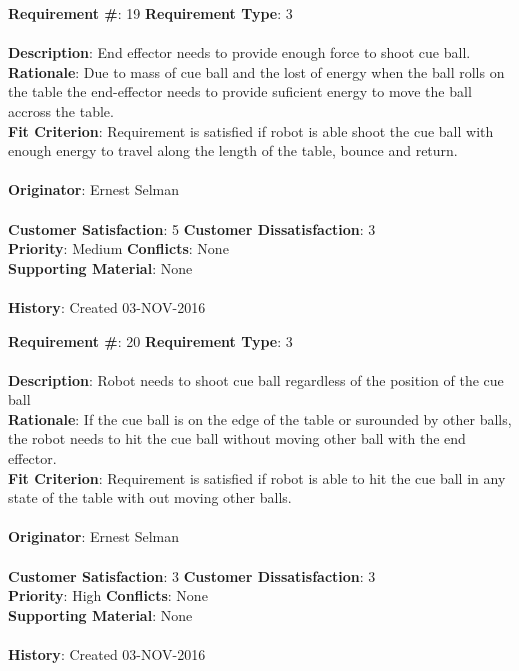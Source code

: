 \documentclass[titlepage]{article}
\begin{document}
\begin{framed}
	\noindent\textbf{Requirement \#}: 19 \hfill \textbf{Requirement Type}: 3 \hfill\\\\
	\noindent\textbf{Description}: End effector needs to provide enough force to shoot cue ball. \\
	\textbf{Rationale}: Due to mass of cue ball and the lost of energy when the ball rolls on the table the end-effector needs to provide suficient energy to move the ball accross the table.\\
	\textbf{Fit Criterion}: Requirement is satisfied if robot is able shoot the cue ball with enough energy to travel along the length of the table, bounce and return. \\\\
	\textbf{Originator}: Ernest Selman\\\\
	\noindent\textbf{Customer Satisfaction}: 5 \hfill 	\textbf{Customer Dissatisfaction}: 3 \hfill\\
	\textbf{Priority}: Medium \hfill \textbf{Conflicts}: None \hfill\\
	\textbf{Supporting Material}: None\\\\
	\noindent\textbf{History}: Created 03-NOV-2016
\end{framed}

\begin{framed}
	\noindent\textbf{Requirement \#}: 20 \hfill \textbf{Requirement Type}: 3 \hfill\\\\
	\noindent\textbf{Description}: Robot needs to shoot cue ball regardless of the position of the cue ball  \\
	\textbf{Rationale}: If the cue ball is on the edge of the table or surounded by other balls, the robot needs to hit the cue ball without moving other ball with the end effector. \\
	\textbf{Fit Criterion}: Requirement is satisfied if robot is able to hit the cue ball in any state of the table with out moving other balls. \\\\
	\textbf{Originator}: Ernest Selman\\\\
	\noindent\textbf{Customer Satisfaction}: 3 \hfill 	\textbf{Customer Dissatisfaction}: 3 \hfill\\
	\textbf{Priority}: High \hfill \textbf{Conflicts}: None \hfill\\
	\textbf{Supporting Material}: None\\\\
	\noindent\textbf{History}: Created 03-NOV-2016
\end{framed}
\end{document}

